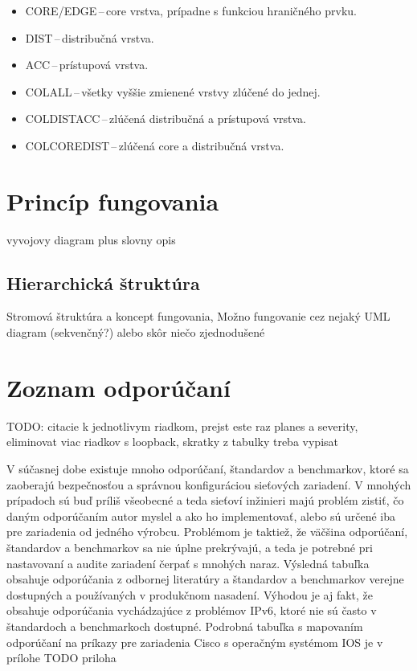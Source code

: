 \begin{itemize}
	\item CORE/EDGE\,--\,core vrstva, prípadne s funkciou hraničného prvku.
	\item DIST\,--\,distribučná vrstva.
	\item ACC\,--\,prístupová vrstva.
	\item COLALL\,--\,všetky vyššie zmienené vrstvy zlúčené do jednej.
	\item COLDISTACC\,--\,zlúčená distribučná a prístupová vrstva.
	\item COLCOREDIST\,--\,zlúčená core a distribučná vrstva.
\end{itemize}

\section{Princíp fungovania}
vyvojovy diagram plus slovny opis
\subsection*{Hierarchická štruktúra}
Stromová štruktúra a koncept fungovania, Možno fungovanie cez nejaký UML diagram (sekvenčný?) alebo skôr niečo zjednodušené

\section{Zoznam odporúčaní}
 TODO: citacie k jednotlivym riadkom, prejst este raz planes a severity, eliminovat viac riadkov s loopback, skratky z tabulky treba vypisat                                                                                                                                                                                                                                                                                                                                                                                                                                                                                                                                                                                                     

V súčasnej dobe existuje mnoho odporúčaní, štandardov a benchmarkov, ktoré sa zaoberajú bezpečnosťou a správnou konfiguráciou sieťových zariadení. V mnohých prípadoch sú buď príliš všeobecné a teda sieťoví inžinieri majú problém zistiť, čo daným odporúčaním autor myslel a ako ho implementovať, alebo sú určené iba pre zariadenia od jedného výrobcu. Problémom je taktiež, že väčšina odporúčaní, štandardov a benchmarkov sa nie úplne prekrývajú, a teda je potrebné pri nastavovaní a audite zariadení čerpať s mnohých naraz. Výsledná tabuľka obsahuje odporúčania z odbornej literatúry a štandardov a benchmarkov verejne dostupných a používaných v produkčnom nasadení. Výhodou je aj fakt, že obsahuje odporúčania vychádzajúce z problémov IPv6, ktoré nie sú často v štandardoch a benchmarkoch dostupné. Podrobná tabuľka s mapovaním odporúčaní na príkazy pre zariadenia Cisco s operačným systémom IOS je v prílohe TODO priloha %


